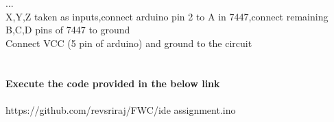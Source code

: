 \documentclass{article}
\begin{document}
...\\
X,Y,Z taken as inputs,connect arduino pin 2 to A in 7447,connect remaining B,C,D pins of 7447 to ground\\
Connect VCC (5 pin of arduino) and ground to the circuit
\\
\\
\\
\textbf{Execute the code provided in the below link}
\\
\\
https://github.com/revsriraj/FWC/ide assignment.ino
\end{document}
